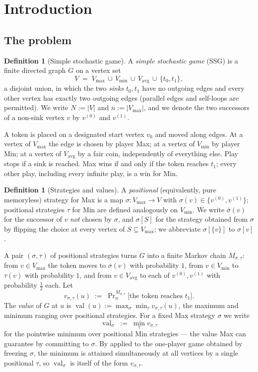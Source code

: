 \documentclass[11pt]{article}
\theoremstyle{plain}
\theoremstyle{definition}
\newtheorem{definition}[theorem]{Definition}
\DeclareMathOperator{\val}{val}
\newcommand{\Vmax}{V_{\max}}
\newcommand{\Vmin}{V_{\min}}
\newcommand{\Vavg}{V_{\mathrm{avg}}}
\begin{document}
\tableofcontents

\section{Introduction}

\subsection{The problem}

\begin{definition}[Simple stochastic game]\label{def:ssg}
A \emph{simple stochastic game} (SSG) is a finite directed graph $G$ on a
vertex set
\[
  V \;=\; \Vmax \,\cup\, \Vmin \,\cup\, \Vavg \,\cup\, \{t_0,t_1\},
\]
a disjoint union, in which the two \emph{sinks} $t_0,t_1$ have no outgoing
edges and every other vertex has exactly two outgoing edges (parallel
edges and self-loops are permitted). We write $N := |V|$ and
$n := |\Vmax|$, and we denote the two successors of a non-sink vertex $v$
by $v^{(0)}$ and $v^{(1)}$.

A token is placed on a designated start vertex $v_0$ and moved along
edges. At a vertex of $\Vmax$ the edge is chosen by player Max; at a
vertex of $\Vmin$ by player Min; at a vertex of $\Vavg$ by a fair coin,
independently of everything else. Play stops if a sink is reached. Max
wins if and only if the token reaches $t_1$; every other play, including
every infinite play, is a win for Min.
\end{definition}

\begin{definition}[Strategies and values]\label{def:strategies}
A \emph{positional} (equivalently, pure memoryless) strategy for Max is a
map $\sigma\colon \Vmax\to V$ with $\sigma(v)\in\{v^{(0)},v^{(1)}\}$;
positional strategies $\tau$ for Min are defined analogously on $\Vmin$.
We write $\bar\sigma(v)$ for the successor of $v$ \emph{not} chosen by
$\sigma$, and $\sigma[S]$ for the strategy obtained from $\sigma$ by
flipping the choice at every vertex of $S\subseteq\Vmax$; we abbreviate
$\sigma[\{v\}]$ to $\sigma[v]$.

A pair $(\sigma,\tau)$ of positional strategies turns $G$ into a finite
Markov chain $M_{\sigma,\tau}$: from $v\in\Vmax$ the token moves to
$\sigma(v)$ with probability $1$, from $v\in\Vmin$ to $\tau(v)$ with
probability $1$, and from $v\in\Vavg$ to each of $v^{(0)},v^{(1)}$ with
probability $\tfrac12$ each. Let
\[
  v_{\sigma,\tau}(u)\;:=\;\Pr\nolimits^{M_{\sigma,\tau}}_{u}\bigl[\text{the token reaches } t_1\bigr].
\]
The \emph{value} of $G$ at $u$ is
$\val(u):=\max_\sigma\min_\tau v_{\sigma,\tau}(u)$, the maximum and
minimum ranging over positional strategies. For a fixed Max strategy
$\sigma$ we write
\[
  \val_\sigma\;:=\;\min_\tau v_{\sigma,\tau}
\]
for the pointwise minimum over positional Min strategies --- the value
Max can guarantee by committing to $\sigma$. By 
applied to the one-player game obtained by freezing $\sigma$, the minimum
is attained simultaneously at all vertices by a single positional $\tau$,
so $\val_\sigma$ is itself of the form $v_{\sigma,\tau}$.
\end{definition}
\end{document}
